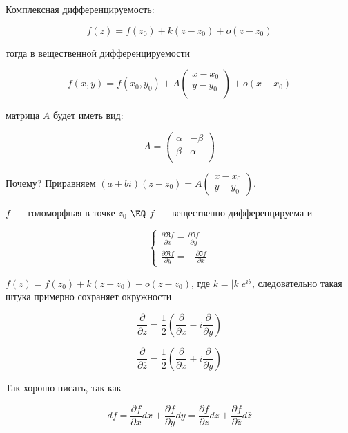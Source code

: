 \begin{observation}
    Комплексная дифференцируемость:

    \[ f(z) = f(z_0) + k(z - z_0) + o(z-z_0) \]

    тогда в вещественной дифференцируемости

    \[
        f(x, y) = f(x_0, y_0) +
        A \begin{pmatrix}
            x - x_0 \\
            y - y_0 \\
        \end{pmatrix}
        + o (x - x_0)
    \]

    матрица $A$ будет иметь вид:

    \[
        A = \begin{pmatrix}
            \alpha & -\beta \\
            \beta  & \alpha \\
        \end{pmatrix}
    \]

    Почему? Приравняем $(a + bi)(z-z_0) = A\begin{pmatrix}x-x_0\\y-y_0\end{pmatrix}$.

    $f$~--- голоморфная в точке $z_0$ $\EQ$
    $f$~--- вещественно-дифференцируема и

    \[
        \begin{cases}
            \frac{\partial \Re f}{\partial x}
            = \frac{\partial \Im f}{\partial y} \\
            \frac{\partial \Re f}{\partial y}
            = -\frac{\partial \Im f}{\partial x}
        \end{cases}
    \]
\end{observation}

\begin{observation}
    $f(z) = f(z_0) + k(z-z_0) + o(z - z_0)$,
    где $k = |k|e^{i\theta}$, следовательно
    такая штука примерно сохраняет окружности
\end{observation}

\begin{notation}
    \[
        \frac{\partial}{\partial z}
        = \frac12 \left( \frac{\partial}{\partial x}
        - i\frac{\partial}{\partial y} \right)
    \]

    \[
        \frac{\partial}{\partial \overline{z}}
        = \frac12 \left( \frac{\partial}{\partial x}
        + i\frac{\partial}{\partial y} \right)
    \]

    Так хорошо писать, так как

    \[
        df = \frac{\partial f}{\partial x} dx +
        \frac{\partial f}{\partial y} dy =
        \frac{\partial f}{\partial z} dz
        + \frac{\partial f}{\partial \overline{z}} d\overline{z}
    \]
\end{notation}

